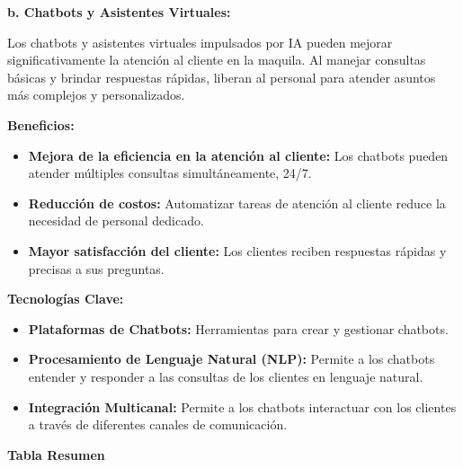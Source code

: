 \documentclass[
  10pt,
  letterpaper,
]{book}
\providecommand{\tightlist}{%
  \setlength{\itemsep}{0pt}\setlength{\parskip}{0pt}}\usepackage{longtable,booktabs,array}
\begin{document}
\textbf{b. Chatbots y Asistentes Virtuales:}

Los chatbots y asistentes virtuales impulsados por IA pueden mejorar
significativamente la atención al cliente en la maquila. Al manejar
consultas básicas y brindar respuestas rápidas, liberan al personal para
atender asuntos más complejos y personalizados.

\textbf{Beneficios:}

\begin{itemize}
\tightlist
\item
  \textbf{Mejora de la eficiencia en la atención al cliente:} Los
  chatbots pueden atender múltiples consultas simultáneamente, 24/7.
\item
  \textbf{Reducción de costos:} Automatizar tareas de atención al
  cliente reduce la necesidad de personal dedicado.
\item
  \textbf{Mayor satisfacción del cliente:} Los clientes reciben
  respuestas rápidas y precisas a sus preguntas.
\end{itemize}

\textbf{Tecnologías Clave:}

\begin{itemize}
\tightlist
\item
  \textbf{Plataformas de Chatbots:} Herramientas para crear y gestionar
  chatbots.
\item
  \textbf{Procesamiento de Lenguaje Natural (NLP):} Permite a los
  chatbots entender y responder a las consultas de los clientes en
  lenguaje natural.
\item
  \textbf{Integración Multicanal:} Permite a los chatbots interactuar
  con los clientes a través de diferentes canales de comunicación.
\end{itemize}

\textbf{Tabla Resumen}
\end{document}
